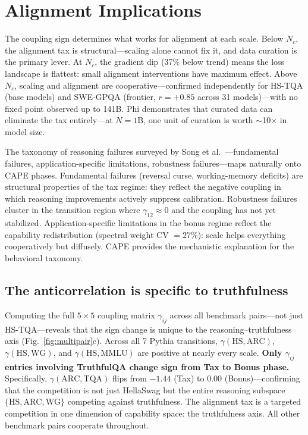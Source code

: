 \documentclass[11pt]{article}
\begin{document}
\section{Alignment Implications}
\label{sec:alignment}

The coupling sign determines what works for alignment at each scale.
Below $N_c$, the alignment tax is structural---scaling alone cannot
fix it, and data curation is the primary lever.
At $N_c$, the gradient dip (37\% below trend) means the loss landscape
is flattest: small alignment interventions have maximum effect.
Above $N_c$, scaling and alignment are cooperative---confirmed independently for HS-TQA (base models) and SWE-GPQA (frontier, $r=+0.85$ across 31 models)---with no fixed point observed up to 141B.
Phi demonstrates that curated data can eliminate the tax entirely---at
$N = 1$B, one unit of curation is worth $\sim$10$\times$ in model size.

The taxonomy of reasoning failures surveyed by Song et al.~\cite{song2026}---fundamental failures, application-specific limitations, robustness failures---maps naturally onto CAPE phases.
Fundamental failures (reversal curse, working-memory deficits) are structural properties of the tax regime: they reflect the negative coupling in which reasoning improvements actively suppress calibration.
Robustness failures cluster in the transition region where $\gamma_{12} \approx 0$ and the coupling has not yet stabilized.
Application-specific limitations in the bonus regime reflect the capability redistribution (spectral weight CV $=27\%$): scale helps everything cooperatively but diffusely.
CAPE provides the mechanistic explanation for the behavioral taxonomy.

\subsection{The anticorrelation is specific to truthfulness}

Computing the full $5{\times}5$ coupling matrix $\gamma_{ij}$ across all benchmark pairs---not just HS-TQA---reveals
that the sign change is unique to the reasoning--truthfulness axis (Fig.~\ref{fig:multipair}c).
Across all 7 Pythia transitions, $\gamma(\mathrm{HS}, \mathrm{ARC})$,
$\gamma(\mathrm{HS}, \mathrm{WG})$, and $\gamma(\mathrm{HS}, \mathrm{MMLU})$
are positive at nearly every scale.
\textbf{Only $\gamma_{ij}$ entries involving TruthfulQA change sign from Tax to Bonus phase.}
Specifically, $\gamma(\mathrm{ARC}, \mathrm{TQA})$ flips from $-1.44$ (Tax) to $0.00$ (Bonus)---confirming that the competition is not just HellaSwag but the entire reasoning subspace $\{\mathrm{HS}, \mathrm{ARC}, \mathrm{WG}\}$ competing against truthfulness.
The alignment tax is a targeted competition in one dimension of capability space: the truthfulness axis.
All other benchmark pairs cooperate throughout.
\end{document}
